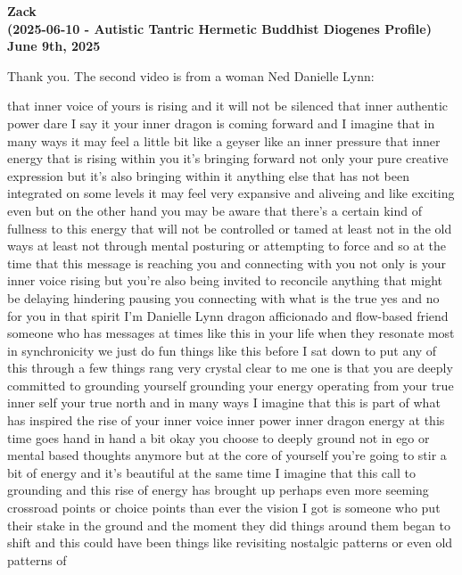 \documentclass{article}
\begin{document}
\begin{center}
\textbf{Zack} \\
\textbf{(2025-06-10 - Autistic Tantric Hermetic Buddhist Diogenes Profile)} \\
\textbf{June 9th, 2025}
\end{center}

\medskip

Thank you. The second video is from a woman Ned Danielle Lynn:

that inner voice of yours is rising and it will not be silenced that
inner authentic power dare I say it your inner dragon is coming forward
and I imagine that in many ways it may feel a little bit like a geyser
like an inner pressure that inner energy that is rising within you it's
bringing forward not only your pure creative expression but it's also
bringing within it anything else that has not been integrated on some
levels it may feel very expansive and aliveing and like exciting even
but on the other hand you may be aware that there's a certain kind of
fullness to this energy that will not be controlled or tamed at least
not in the old ways at least not through mental posturing or attempting
to force and so at the time that this message is reaching you and
connecting with you not only is your inner voice rising but you're also
being invited to reconcile anything that might be delaying hindering
pausing you connecting with what is the true yes and no for you in that
spirit I'm Danielle Lynn dragon afficionado and flow-based friend
someone who has messages at times like this in your life when they
resonate most in synchronicity we just do fun things like this before I
sat down to put any of this through a few things rang very crystal clear
to me one is that you are deeply committed to grounding yourself
grounding your energy operating from your true inner self your true
north and in many ways I imagine that this is part of what has inspired
the rise of your inner voice inner power inner dragon energy at this
time goes hand in hand a bit okay you choose to deeply ground not in ego
or mental based thoughts anymore but at the core of yourself you're
going to stir a bit of energy and it's beautiful at the same time I
imagine that this call to grounding and this rise of energy has brought
up perhaps even more seeming crossroad points or choice points than ever
the vision I got is someone who put their stake in the ground and the
moment they did things around them began to shift and this could have
been things like revisiting nostalgic patterns or even old patterns of
\end{document}
